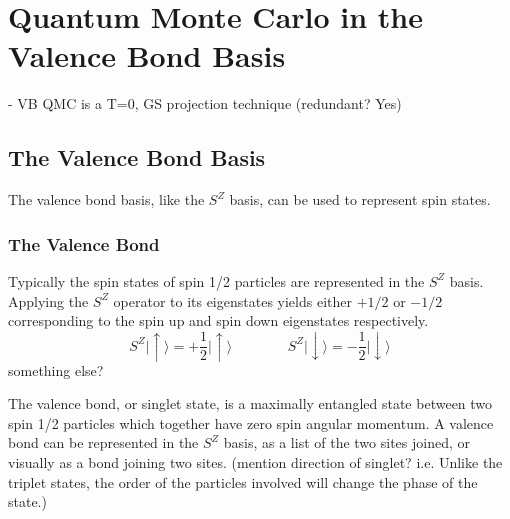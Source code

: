 \chapter{Quantum Monte Carlo in the Valence Bond Basis}

- VB QMC is a T=0, GS projection technique (redundant? Yes)\\
\section{The Valence Bond Basis}

{\color{red} The valence bond basis, like the $S^Z$ basis, can be used to represent spin states.}

\subsection{The Valence Bond}


Typically the spin states of spin 1/2 particles are represented in the $S^Z$ basis.  Applying the
$S^Z$ operator to its eigenstates yields either $+1/2$ or $-1/2$ corresponding to the spin up
and spin down eigenstates respectively.
\begin{equation}
   S^Z\lvert \uparrow \rangle = +\frac{1}{2} \lvert \uparrow \rangle
   \:\:\:    \:\:\:    \:\:\:    \:\:\:    \:\:\:    \:\:\: 
   S^Z\lvert \downarrow \rangle = -\frac{1}{2} \lvert \downarrow \rangle
   \label{SZ}
\end{equation}
{\color{red} something else?}

The valence bond, or singlet state, is a maximally entangled state between two spin 1/2 particles
which together have zero spin angular momentum.  A valence bond can be represented in the $S^Z$ basis, as a list of the two sites joined, or 
visually as a bond joining two sites.  {\color{red} (mention direction of singlet? i.e. Unlike the triplet states, the order of the particles involved will change the phase of the state.)}

